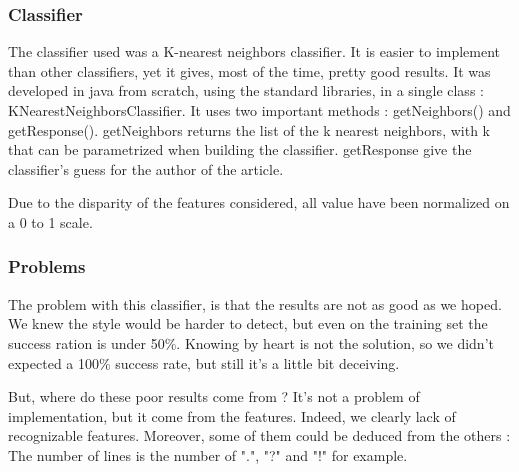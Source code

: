 \subsubsection{Classifier}

The classifier used was a K-nearest neighbors classifier. It is easier to implement than other classifiers, yet it gives, most of the time, pretty good results.
It was developed in java from scratch, using the standard libraries, in a single class : KNearestNeighborsClassifier. It uses two important methods : getNeighbors() and getResponse().
getNeighbors returns the list of the k nearest neighbors, with k that can be parametrized when building the classifier.
getResponse give the classifier's guess for the author of the article.

Due to the disparity of the features considered, all value have been normalized on a 0 to 1 scale.


\subsubsection{Problems}
The problem with this classifier, is that the results are not as good as we hoped. We knew the style would be harder to detect, but even on the training set the success ration is under 50\%. Knowing by heart is not the solution, so we didn't expected a 100\% success rate, but still it's a little bit deceiving. 

But, where do these poor results come from ? It's not a problem of implementation, but it come from the features. Indeed, we clearly lack of recognizable features. Moreover, some of them could be deduced from the others : The number of lines is the number of ".", "?" and "!" for example.